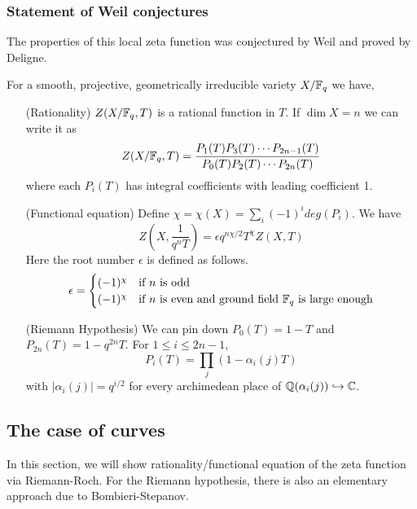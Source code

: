 \subsubsection{Statement of Weil conjectures}
The properties of this local zeta function was conjectured by Weil and proved by Deligne.
\begin{thm}[Deligne]
For a smooth, projective, geometrically irreducible variety $X/\mathbb{F}_q$ we have,
\begin{itemize}
    \item[(Rationality)] $Z(X/\mathbb{F}_q, T)$ is a rational function in $T$. If $\dim X = n$ we can write it as 
    \[
    Z(X/\mathbb{F}_q,T) = \frac{P_1(T)P_3(T)\cdots P_{2n-1}(T)}{P_0(T)P_2(T) \cdots P_{2n}(T)}
    \]
    where each $P_i(T)$ has integral coefficients with leading coefficient 1.
    \item[(Functional equation)] Define $\chi = \chi(X) = \sum_i (-1)^i deg(P_i)$. We have
    \[
    Z\left(X, \frac{1}{q^n T}\right) = \epsilon q^{n \chi /2} T^{\chi} Z(X,T)
    \]
    Here the root number $\epsilon$ is defined as follows.
    \[
    \epsilon = \begin{cases}(-1)^{\chi} & \text{if $n$ is odd} \\ (-1)^{\chi} & \text{if $n$ is even and ground field $\mathbb{F}_q$ is large enough}\end{cases}
    \]
    \item[(Riemann Hypothesis)] We can pin down $P_0(T) = 1-T$ and $P_{2n}(T) = 1-q^{2n}T$. For $1 \leq i \leq 2n-1$, 
    \[
    P_i(T) = \prod_j (1 - \alpha_i(j) T)
    \]
    with $|\alpha_i(j)| = q^{i/2}$ for every archimedean place of $\mathbb{Q}(\alpha_i(j)) \hookrightarrow \mathbb{C}$.
\end{itemize}
\end{thm}
\subsection{The case of curves}
In this section, we will show rationality/functional equation of the zeta function via Riemann-Roch. For the Riemann hypothesis, there is also an elementary approach due to Bombieri-Stepanov.

